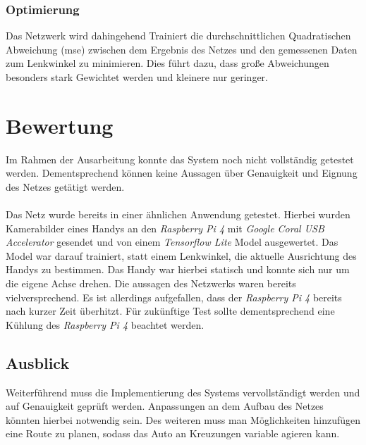 \documentclass[a4paper, 12pt]{scrartcl}
\begin{document}
				\subsubsection{Optimierung}
				Das Netzwerk wird dahingehend Trainiert die durchschnittlichen Quadratischen Abweichung (mse) zwischen dem Ergebnis des Netzes und den gemessenen Daten zum Lenkwinkel zu minimieren. Dies führt dazu, dass große Abweichungen besonders stark Gewichtet werden und kleinere nur geringer. 
		
	\section{Bewertung}
	Im Rahmen der Ausarbeitung konnte das System noch nicht vollständig getestet werden. Dementsprechend können keine Aussagen über Genauigkeit und Eignung des Netzes getätigt werden. \\ \\
	Das Netz wurde bereits in einer ähnlichen Anwendung getestet. Hierbei wurden Kamerabilder eines Handys an den \emph{Raspberry Pi 4} mit \emph{Google Coral USB Accelerator} gesendet und von einem \emph{Tensorflow Lite} Model ausgewertet. Das Model war darauf trainiert, statt einem Lenkwinkel, die aktuelle Ausrichtung des Handys zu bestimmen. Das Handy war hierbei statisch und konnte sich nur um die eigene Achse drehen. Die aussagen des Netzwerks waren bereits vielversprechend. Es ist allerdings aufgefallen, dass der \emph{Raspberry Pi 4} bereits nach kurzer Zeit überhitzt. Für zukünftige Test sollte dementsprechend eine Kühlung des \emph{Raspberry Pi 4} beachtet werden.
	
		\subsection {Ausblick}
		Weiterführend muss die Implementierung des Systems vervollständigt werden und auf Genauigkeit geprüft werden. Anpassungen an dem Aufbau des Netzes könnten hierbei notwendig sein. Des weiteren muss man Möglichkeiten hinzufügen eine Route zu planen, sodass das Auto an Kreuzungen variable agieren kann.
		
	
		
	
	
	\nocite{*}
	
\end{document}
